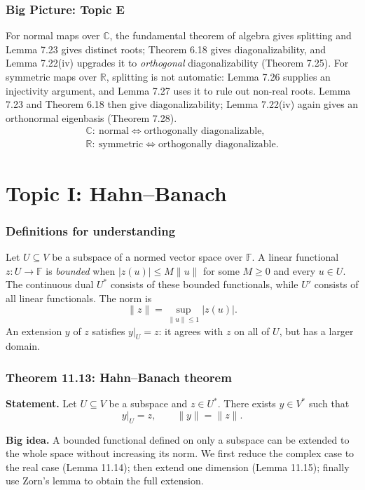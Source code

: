 \documentclass[11pt,a4paper]{article}
\newcommand{\F}{\mathbb F}
\begin{document}
\section*{Big Picture: Topic E}
For normal maps over \(\mathbb C\), the fundamental theorem of algebra gives splitting and Lemma 7.23 gives distinct roots; Theorem 6.18 gives diagonalizability, and Lemma 7.22(iv) upgrades it to \emph{orthogonal} diagonalizability (Theorem 7.25).
For symmetric maps over \(\mathbb R\), splitting is not automatic: Lemma 7.26 supplies an injectivity argument, and Lemma 7.27 uses it to rule out non-real roots. Lemma 7.23 and Theorem 6.18 then give diagonalizability; Lemma 7.22(iv) again gives an orthonormal eigenbasis (Theorem 7.28).
\[
\boxed{\begin{gathered}
\mathbb C:\ \text{normal}\Longleftrightarrow\text{orthogonally diagonalizable},\\
\mathbb R:\ \text{symmetric}\Longleftrightarrow\text{orthogonally diagonalizable}.
\end{gathered}}
\]


\clearpage
\part*{Topic I: Hahn--Banach}

\section*{Definitions for understanding}
Let \(U\subseteq V\) be a subspace of a normed vector space over \(\F\).
A linear functional \(z:U\to\F\) is \emph{bounded} when \(|z(u)|\leq M\|u\|\) for some \(M\geq0\) and every \(u\in U\).
The continuous dual \(U^*\) consists of these bounded functionals, while \(U'\) consists of all linear functionals. The norm is
\[
 \|z\|=\sup_{\|u\|\leq1}|z(u)|.
\]
An extension \(y\) of \(z\) satisfies \(y|_U=z\): it agrees with \(z\) on all of \(U\), but has a larger domain.

\section{Theorem 11.13: Hahn--Banach theorem}
\textbf{Statement.} Let \(U\subseteq V\) be a subspace and \(z\in U^*\). There exists \(y\in V^*\) such that
\[
 \boxed{y|_U=z,\qquad\|y\|=\|z\|.}
\]
\begin{personalnote}
\textbf{Big idea.} A bounded functional defined on only a subspace can be extended to the whole space without increasing its norm. We first reduce the complex case to the real case (Lemma 11.14); then extend one dimension (Lemma 11.15); finally use Zorn's lemma to obtain the full extension.
\end{personalnote}
\end{document}
